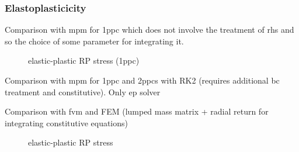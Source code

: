 \subsubsection{Elastoplasticicity}
Comparison with mpm for 1ppc which does not involve the treatment of rhs and so the choice of some parameter for integrating it.
\begin{figure}[h!]
  \centering
  {}
  \caption{elastic-plastic RP stress (1ppc)}
  \label{fig:stress_elastoplastic_RP}
\end{figure}


Comparison with mpm for 1ppc and 2ppcs with RK2 (requires additional bc treatment and constitutive). Only ep solver


Comparison with fvm and FEM (lumped mass matrix + radial return for integrating constitutive equations)
\begin{figure}[h!]
  \centering
  {}
  \caption{elastic-plastic RP stress}
  \label{fig:stress_elastoplastic_RP}
\end{figure}


